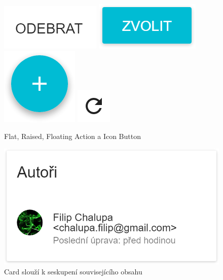 \begin{figure}
	\mbox{\includegraphics[scale=0.5]{sections/ui/images/Button-Flat.png}}   
	\hspace{12px}
	\mbox{\includegraphics[scale=0.5]{sections/ui/images/Button-Raised.png}}
	\hspace{12px}
	\mbox{\includegraphics[scale=0.5]{sections/ui/images/Button-Floating.png}}
	\hspace{12px}
	\mbox{\includegraphics[scale=0.5]{sections/ui/images/Button-Icon.png}}
	\caption[Button]{Flat, Raised, Floating Action a Icon Button}
\end{figure}

\begin{figure}
	\centering
	\includegraphics[scale=0.5]{sections/ui/images/Card.png}
	\caption[Card]{Card slouží k seskupení souvisejícího obsahu}
\end{figure}

